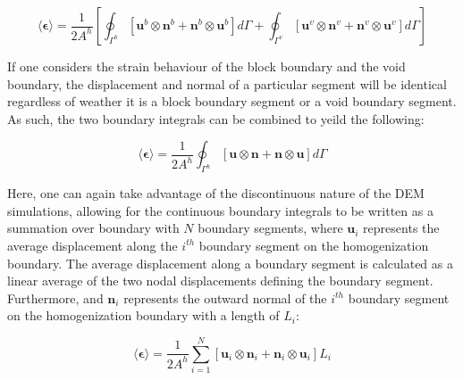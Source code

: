 \begin{equation}
\langle\boldsymbol{\epsilon}\rangle=\frac{1}{2A^{h}}\left[\oint_{\Gamma^{b}}\left[\mathbf{u}^{b}\otimes\mathbf{n}^{b}+\mathbf{n}^{b}\otimes\mathbf{u}^{b}\right]d\Gamma+\oint_{\Gamma^{v}}\left[\mathbf{u}^{v}\otimes\mathbf{n}^{v}+\mathbf{n}^{v}\otimes\mathbf{u}^{v}\right]d\Gamma\right]\label{eqn:strain5}
\end{equation}


If one considers the strain behaviour of the block boundary and the
void boundary, the displacement and normal of a particular segment
will be identical regardless of weather it is a block boundary segment
or a void boundary segment. As such, the two boundary integrals can
be combined to yeild the following:

\begin{equation}
\langle\boldsymbol{\epsilon}\rangle=\frac{1}{2A^{h}}\oint_{\Gamma^{h}}\left[\mathbf{u}\otimes\mathbf{n}+\mathbf{n}\otimes\mathbf{u}\right]d\Gamma\label{eqn:strain5-1}
\end{equation}


Here, one can again take advantage of the discontinuous nature of
the DEM simulations, allowing for the continuous boundary integrals
to be written as a summation over boundary with $N$ boundary segments,
where $\mathbf{u}_{i}$ represents the average displacement along
the $i^{th}$ boundary segment on the homogenization boundary. The
average displacement along a boundary segment is calculated as a linear
average of the two nodal displacements defining the boundary segment.
Furthermore, and $\mathbf{n}_{i}$ represents the outward normal of
the $i^{th}$ boundary segment on the homogenization boundary with
a length of $L_{i}$:

\begin{equation}
\langle\boldsymbol{\epsilon}\rangle=\frac{1}{2A^{h}}\sum_{i=1}^{N}\left[\mathbf{u}_{i}\otimes\mathbf{n}_{i}+\mathbf{n}_{i}\otimes\mathbf{u}_{i}\right]L_{i}\label{eqn:strain7}
\end{equation}
